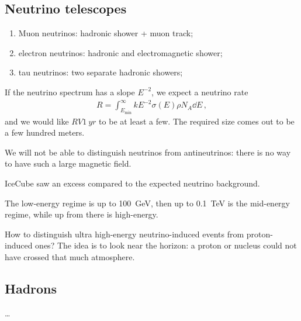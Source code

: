 \documentclass[main.tex]{subfiles}
\begin{document}
\subsection{Neutrino telescopes}


\begin{enumerate}
    \item Muon neutrinos: hadronic shower + muon track;
    \item electron neutrinos: hadronic and electromagnetic shower;
    \item tau neutrinos: two separate hadronic showers;
\end{enumerate}

If the neutrino spectrum has a slope \(E^{-2}\), we expect a neutrino rate 
%
\begin{align}
R = \int _{E_{\text{min}}}^{ \infty } k E^{-2} \sigma (E) \rho N_A \dd{E}
\,,
\end{align}
%
and we would like \(R V \SI{1}{yr}\) to be at least a few. 
The required size comes out to be a few hundred meters. 

We will not be able to distinguish neutrinos from antineutrinos: there
is no way to have such a large magnetic field.  

IceCube saw an excess compared to the expected neutrino background. 

The low-energy regime is up to \SI{100}{GeV}, then up to \SI{0.1}{TeV} is the mid-energy regime, while up from there is high-energy. 

How to distinguish ultra high-energy neutrino-induced events from proton-induced ones? 
The idea is to look near the horizon: a proton or nucleus could not have 
crossed that much atmosphere. 

\subsection{Hadrons}

\dots
\end{document}
